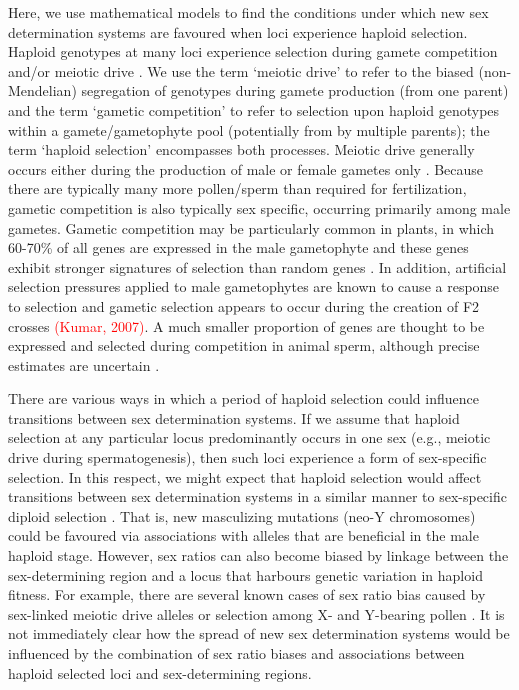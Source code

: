 \documentclass[12pt]{article}
\begin{document}
Here, we use mathematical models to find the conditions under which new sex determination systems are favoured when loci experience haploid selection. 
Haploid genotypes at many loci experience selection during gamete competition and/or meiotic drive \citep{Mulcahy:1996ha,JOSEPH:2004haa}.
We use the term `meiotic drive' to refer to the biased (non-Mendelian) segregation of genotypes during gamete production (from one parent) and the term `gametic competition' to refer to selection upon haploid genotypes within a gamete/gametophyte pool (potentially from by multiple parents); the term `haploid selection' encompasses both processes. 
Meiotic drive generally occurs either during the production of male or female gametes only \citep{Ubeda:2005gw,Lindholm:2016cw}.
Because there are typically many more pollen/sperm than required for fertilization, gametic competition is also typically sex specific, occurring primarily among male gametes.
Gametic competition may be particularly common in plants, in which 60-70\% of all genes are expressed in the male gametophyte and these genes exhibit stronger signatures of selection than random genes \citep{Borg:2009jpa,Arunkumar:2013iq,Gossmann:2014dua}.
In addition, artificial selection pressures applied to male gametophytes are known to cause a response to selection \citep[e.g.,][]{Hormaza:1996cv,Ravikumar:2003uo,Hedhly:2004iv,Clarke:2004ir} and gametic selection appears to occur during the creation of F2 crosses \textcolor{red}{(Kumar, 2007)}. 
A much smaller proportion of genes are thought to be expressed and selected during competition in animal sperm, although precise estimates are uncertain \citep{Zheng:2001fi,JOSEPH:2004haa,Vibranovski:2010et,Immler:2014im}. 

There are various ways in which a period of haploid selection could influence transitions between sex determination systems. 
If we assume that haploid selection at any particular locus predominantly occurs in one sex (e.g., meiotic drive during spermatogenesis), then such loci experience a form of sex-specific selection. 
In this respect, we might expect that haploid selection would affect transitions between sex determination systems in a similar manner to sex-specific diploid selection \citep[as explored by][]{vanDoorn:2007eu,vanDoorn:2010hu}. 
That is, new masculizing mutations (neo-Y chromosomes) could be favoured via associations with alleles that are beneficial in the male haploid stage. 
However, sex ratios can also become biased by linkage between the sex-determining region and a locus that harbours genetic variation in haploid fitness. 
For example, there are several known cases of sex ratio bias caused by sex-linked meiotic drive alleles \citep[][Chapter 3]{Burt:2006} or selection among X- and Y-bearing pollen \citep{Lloyd:1974tz,Conn:1981uw,Stehlik:2005ul,Stehlik:2006to,Field:2012fd,Field:2013cc}. 
It is not immediately clear how the spread of new sex determination systems would be influenced by the combination of sex ratio biases and associations between haploid selected loci and sex-determining regions. 
\end{document}
